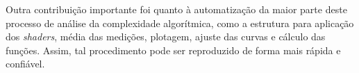 	Outra contribuição importante foi quanto à automatização da maior parte deste processo de análise da complexidade algorítmica, como a estrutura para aplicação dos \textit{shaders}, média das medições, plotagem, ajuste das curvas e cálculo das funções. Assim, tal procedimento pode ser reproduzido de forma mais rápida e confiável. 
